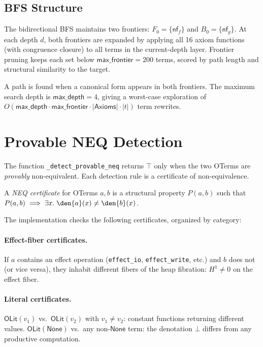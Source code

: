 \subsection{BFS Structure}

The bidirectional BFS maintains two frontiers:
$F_0 = \{\mathsf{nf}_f\}$ and $B_0 = \{\mathsf{nf}_g\}$.
At each depth $d$, both frontiers are expanded by applying all
16 axiom functions (with congruence closure) to all terms in the
current-depth layer.  Frontier pruning keeps each set below
$\mathsf{max\_frontier} = 200$ terms, scored by path length
and structural similarity to the target.

A path is found when a canonical form appears in both frontiers.
The maximum search depth is $\mathsf{max\_depth} = 4$,
giving a worst-case exploration of
$O(\mathsf{max\_depth} \cdot \mathsf{max\_frontier} \cdot
|\mathsf{Axioms}| \cdot |t|)$ term rewrites.


\section{Provable NEQ Detection}
\label{sec:neq-formal}

The function \texttt{\_detect\_provable\_neq} returns $\top$ only
when the two OTerms are \emph{provably} non-equivalent.  Each
detection rule is a certificate of non-equivalence.

\begin{definition}
\label{def:neq-cert}
A \emph{NEQ certificate} for OTerms $a, b$ is a structural
property $P(a, b)$ such that $P(a, b) \implies \exists x.\;
\den{a}(x) \neq \den{b}(x)$.
\end{definition}

The implementation checks the following certificates, organized
by category:

\paragraph{Effect-fiber certificates.}
If $a$ contains an effect operation (\texttt{effect\_io},
\texttt{effect\_write}, etc.) and $b$ does not (or vice versa),
they inhabit different fibers of the heap fibration:
$H^1 \neq 0$ on the effect fiber.

\paragraph{Literal certificates.}
$\mathsf{OLit}(v_1)$ vs.\ $\mathsf{OLit}(v_2)$ with $v_1 \neq v_2$:
constant functions returning different values.
$\mathsf{OLit}(\mathsf{None})$ vs.\ any non-$\mathsf{None}$ term:
the denotation $\bot$ differs from any productive computation.

